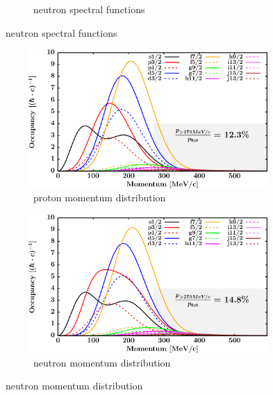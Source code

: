 \begin{figure}[hbtp]
\begin{subfigure}[b]{0.45\textwidth}
        \caption{\niEight\ neutron spectral functions}
        \label{DOMFitData_ni58_neutron_spectralFunctions}
    \end{subfigure}
\end{figure}
\afterpage{\clearpage}
\begin{figure}[hbtp]
    \captionsetup[subfigure]{labelformat=empty}
    \centering
    \begin{subfigure}[b]{0.45\textwidth}
        \centering
        \includegraphics[width=\linewidth]{figures/ni58_protonLJMomentumDistIntegral.png}
        \caption{\niEight\ proton momentum distribution}
        \label{DOMFitData_ni58_proton_momentumDist}
    \end{subfigure}\hspace{6pt}
    \begin{subfigure}[b]{0.45\textwidth}
        \centering
        \includegraphics[width=\linewidth]{figures/ni58_neutronLJMomentumDistIntegral.png}
        \caption{\niEight\ neutron momentum distribution}
        \label{DOMFitData_ni58_neutron_momentumDist}
    \end{subfigure}\vspace{0.3in}

\end{figure}

